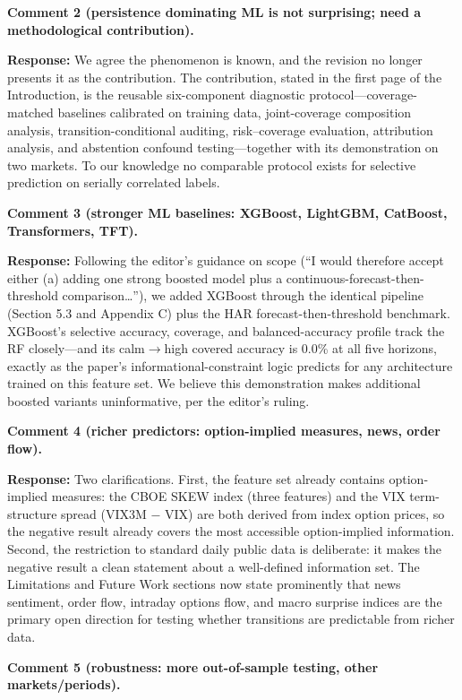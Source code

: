 \documentclass[11pt]{article}
\newcommand{\response}{\textbf{Response:} }
\begin{document}
\textbf{Comment 2 (persistence dominating ML is not surprising; need a methodological
contribution).}

\response We agree the phenomenon is known, and the revision no longer presents it as the
contribution. The contribution, stated in the first page of the Introduction, is the reusable
six-component diagnostic protocol---coverage-matched baselines calibrated on training data,
joint-coverage composition analysis, transition-conditional auditing, risk--coverage
evaluation, attribution analysis, and abstention confound testing---together with its
demonstration on two markets. To our knowledge no comparable protocol exists for selective
prediction on serially correlated labels.

\textbf{Comment 3 (stronger ML baselines: XGBoost, LightGBM, CatBoost, Transformers, TFT).}

\response Following the editor's guidance on scope (``I would therefore accept either (a)
adding one strong boosted model plus a continuous-forecast-then-threshold comparison\ldots''),
we added XGBoost through the identical pipeline (Section 5.3 and Appendix C) plus the HAR
forecast-then-threshold benchmark. XGBoost's selective accuracy, coverage, and
balanced-accuracy profile track the RF closely---and its calm$\to$high covered accuracy is
0.0\% at all five horizons, exactly as the paper's informational-constraint logic predicts for
any architecture trained on this feature set. We believe this demonstration makes additional
boosted variants uninformative, per the editor's ruling.

\textbf{Comment 4 (richer predictors: option-implied measures, news, order flow).}

\response Two clarifications. First, the feature set already contains option-implied
measures: the CBOE SKEW index (three features) and the VIX term-structure spread
(VIX3M $-$ VIX) are both derived from index option prices, so the negative result already
covers the most accessible option-implied information. Second, the restriction to standard
daily public data is deliberate: it makes the negative result a clean statement about a
well-defined information set. The Limitations and Future Work sections now state prominently
that news sentiment, order flow, intraday options flow, and macro surprise indices are the
primary open direction for testing whether transitions are predictable from richer data.

\textbf{Comment 5 (robustness: more out-of-sample testing, other markets/periods).}
\end{document}
